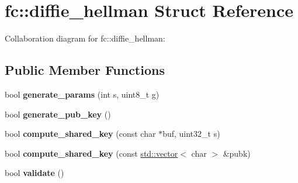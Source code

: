 \hypertarget{structfc_1_1diffie__hellman}{}\section{fc\+:\+:diffie\+\_\+hellman Struct Reference}
\label{structfc_1_1diffie__hellman}


Collaboration diagram for fc\+:\+:diffie\+\_\+hellman\+:
\subsection*{Public Member Functions}
\begin{DoxyCompactItemize}
\item 
\mbox{\label{structfc_1_1diffie__hellman_ac7b158d18c815d628b6e55fc6176f2d0}} 
bool {\bfseries generate\+\_\+params} (int s, uint8\+\_\+t g)
\item 
\mbox{\label{structfc_1_1diffie__hellman_aeb3d4c02a68ccd1110200fedc38b0687}} 
bool {\bfseries generate\+\_\+pub\+\_\+key} ()
\item 
\mbox{\label{structfc_1_1diffie__hellman_a3c855b77794dcac2a1322d623aa5a7ce}} 
bool {\bfseries compute\+\_\+shared\+\_\+key} (const char $\ast$buf, uint32\+\_\+t s)
\item 
\mbox{\label{structfc_1_1diffie__hellman_a303a26a0c28e9d007cba7a217bad2aa8}} 
bool {\bfseries compute\+\_\+shared\+\_\+key} (const \mbox{\hyperlink{classstd_1_1vector}{std\+::vector}}$<$ char $>$ \&pubk)
\item 
\mbox{\label{structfc_1_1diffie__hellman_a4277769577389134e7274c1b19598685}} 
bool {\bfseries validate} ()
\end{DoxyCompactItemize}
